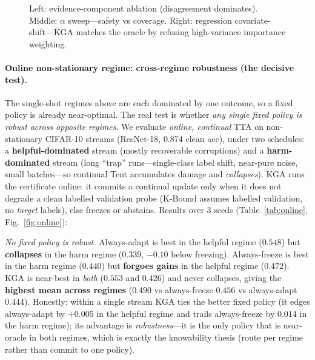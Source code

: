 \documentclass[conference]{IEEEtran}
\theoremstyle{plain}
\theoremstyle{definition}
\begin{document}
\begin{figure}[tb]\centering
{}\hfill
{}\hfill
{}
\caption{Left: evidence-component ablation (disagreement dominates). Middle: $\alpha$
sweep---safety vs coverage. Right: regression covariate-shift---\textsc{KGA} matches the
oracle by refusing high-variance importance weighting.}
\label{fig:extra}
\end{figure}

\FloatBarrier

\paragraph{Online non-stationary regime: cross-regime robustness (the decisive test).}
The single-shot regimes above are each dominated by one outcome, so a fixed policy is
already near-optimal. The real test is whether \emph{any single fixed policy is robust
across opposite regimes}. We evaluate \emph{online, continual} TTA on non-stationary
CIFAR-10 streams (ResNet-18, $0.874$ clean acc), under two schedules:
a \textbf{helpful-dominated} stream (mostly recoverable corruptions) and a
\textbf{harm-dominated} stream (long ``trap'' runs---single-class label shift, near-pure
noise, small batches---so continual Tent accumulates damage and \emph{collapses}).
\textsc{KGA} runs the certificate online: it commits a continual update only when it does
not degrade a clean labelled validation probe (K-Bound assumes labelled validation, no
\emph{target} labels), else freezes or abstains. Results over $3$ seeds
(Table~\ref{tab:online}, Fig.~\ref{fig:online}):

\emph{No fixed policy is robust.} Always-adapt is best in the helpful regime ($0.548$) but
\textbf{collapses} in the harm regime ($0.339$, $-0.10$ below freezing). Always-freeze is
best in the harm regime ($0.440$) but \textbf{forgoes gains} in the helpful regime
($0.472$). \textsc{KGA} is near-best in \emph{both} ($0.553$ and $0.426$) and never
collapses, giving the \textbf{highest mean across regimes} ($0.490$ vs always-freeze
$0.456$ vs always-adapt $0.444$). Honestly: within a single stream \textsc{KGA} ties the
better fixed policy (it edges always-adapt by $+0.005$ in the helpful regime and trails
always-freeze by $0.014$ in the harm regime); its advantage is \emph{robustness}---it is
the only policy that is near-oracle in both regimes, which is exactly the knowability
thesis (route per regime rather than commit to one policy).
\end{document}
